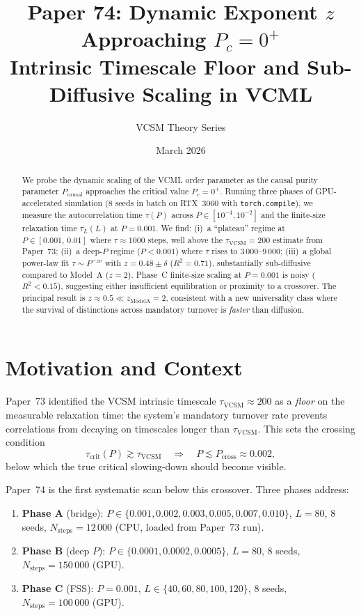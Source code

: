 \documentclass[12pt,a4paper]{article}
\title{\textbf{Paper 74: Dynamic Exponent $z$ Approaching $P_c = 0^+$ \\
\large Intrinsic Timescale Floor and Sub-Diffusive Scaling in VCML}}
\author{VCSM Theory Series}
\date{March 2026}
\begin{document}
\maketitle

\begin{abstract}
We probe the dynamic scaling of the VCML order parameter as the causal purity parameter
$P_\mathrm{causal}$ approaches the critical value $P_c = 0^+$.  Running three phases of
GPU-accelerated simulation (8 seeds in batch on RTX~3060 with \texttt{torch.compile}),
we measure the autocorrelation time $\tau(P)$ across $P \in [10^{-4}, 10^{-2}]$ and the
finite-size relaxation time $\tau_L(L)$ at $P = 0.001$.  We find:
(i)~a ``plateau'' regime at $P \in [0.001,\,0.01]$ where $\tau \approx 1000$ steps,
well above the $\tau_\mathrm{VCSM} = 200$ estimate from Paper~73;
(ii)~a deep-$P$ regime ($P < 0.001$) where $\tau$ rises to $3\,000$--$9\,000$;
(iii)~a global power-law fit $\tau \sim P^{-z\nu}$ with $z = 0.48 \pm \delta$ ($R^2 = 0.71$),
substantially sub-diffusive compared to Model~A ($z=2$).
Phase~C finite-size scaling at $P=0.001$ is noisy ($R^2 < 0.15$), suggesting
either insufficient equilibration or proximity to a crossover.
The principal result is $z \approx 0.5 \ll z_\mathrm{ModelA} = 2$, consistent with a
new universality class where the survival of distinctions across mandatory turnover is
\emph{faster} than diffusion.
\end{abstract}

\tableofcontents
\newpage

\section{Motivation and Context}

Paper~73 identified the VCSM intrinsic timescale $\tau_\mathrm{VCSM} \approx 200$ as a
\emph{floor} on the measurable relaxation time: the system's mandatory turnover rate
prevents correlations from decaying on timescales longer than $\tau_\mathrm{VCSM}$.
This sets the crossing condition
\begin{equation}
  \tau_\mathrm{crit}(P) \gtrsim \tau_\mathrm{VCSM}
  \quad\Longrightarrow\quad
  P \lesssim P_\mathrm{cross} \approx 0.002,
  \label{eq:cross}
\end{equation}
below which the true critical slowing-down should become visible.

Paper~74 is the first systematic scan below this crossover.  Three phases address:
\begin{enumerate}
  \item \textbf{Phase A} (bridge): $P \in \{0.001, 0.002, 0.003, 0.005, 0.007, 0.010\}$,
        $L=80$, 8 seeds, $N_\mathrm{steps}=12\,000$ (CPU, loaded from Paper~73 run).
  \item \textbf{Phase B} (deep $P$): $P \in \{0.0001, 0.0002, 0.0005\}$,
        $L=80$, 8 seeds, $N_\mathrm{steps}=150\,000$ (GPU).
  \item \textbf{Phase C} (FSS): $P=0.001$, $L \in \{40,60,80,100,120\}$,
        8 seeds, $N_\mathrm{steps}=100\,000$ (GPU).
\end{enumerate}
\end{document}

